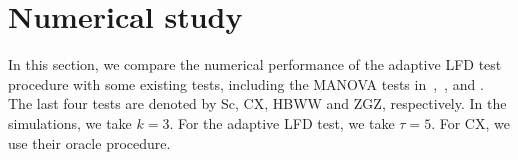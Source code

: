 \documentclass[12pt]{article} %
\DeclareMathOperator{\mytr}{tr}
\DeclareMathOperator{\myE}{E}
\newcommand{\bX}{\mathbf{X}}
\newcommand{\bfsym}[1]{\ensuremath{\boldsymbol{#1}}}
\def\bSigma {\bfsym {\Sigma}}
\def\bTheta {\bfsym {\Theta}}
\theoremstyle{definition}
\begin{document}
%






\section{Numerical study}\label{numerical}

In this section, we compare the numerical performance of the adaptive LFD test procedure with some existing tests, including the MANOVA tests in~\citet{Schott2007Some},~\citet{Cai2014High}, \cite{Hu2017} and \cite{ZHANG2017200}.
The last four tests are denoted by Sc, CX, HBWW and ZGZ, respectively.
In the simulations, we take $k=3$.
For the adaptive LFD test, we take $\tau=5$.
For CX, we use their oracle procedure.
\end{document}
